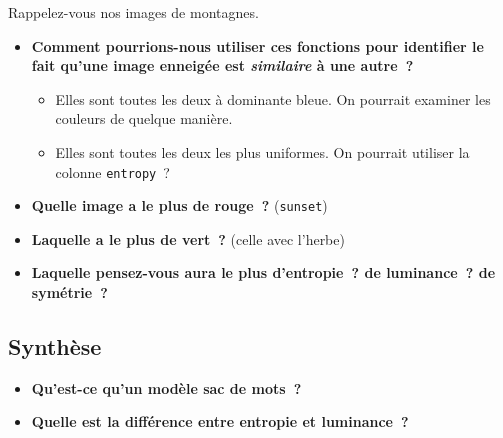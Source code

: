 \documentclass[12pt,a4paper]{article}
\begin{document}
\begin{thinkbox}
  Rappelez-vous nos images de montagnes.
  \begin{itemize}
    \item \textbf{Comment pourrions-nous utiliser ces fonctions pour identifier le fait qu'une image enneigée est \emph{similaire} à une autre~?}
    \begin{itemize}
      \item Elles sont toutes les deux à dominante bleue. On pourrait examiner les couleurs de quelque manière.
      \item Elles sont toutes les deux les plus uniformes. On pourrait utiliser la colonne \texttt{entropy}~?
    \end{itemize}
    \item \textbf{Quelle image a le plus de rouge~?} (\texttt{sunset})
    \item \textbf{Laquelle a le plus de vert~?} (celle avec l'herbe)
    \item \textbf{Laquelle pensez-vous aura le plus d'entropie~? de luminance~? de symétrie~?}
  \end{itemize}
\end{thinkbox}

\subsection{Synthèse}

\begin{thinkbox}
  \begin{itemize}
    \item \textbf{Qu'est-ce qu'un modèle sac de mots~?}
    \item \textbf{Quelle est la différence entre entropie et luminance~?}
  \end{itemize}
\end{thinkbox}
\end{document}
